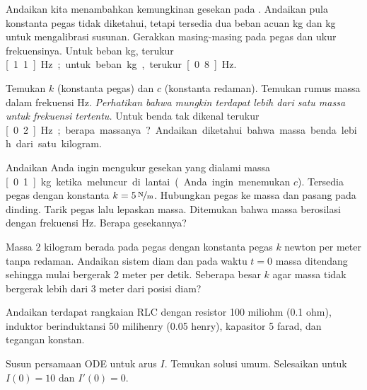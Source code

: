 \begin{exercise}
Andaikan kita menambahkan kemungkinan gesekan pada . Andaikan pula konstanta pegas tidak diketahui, tetapi tersedia dua beban acuan \unit[1]{kg} dan \unit[2]{kg} untuk mengalibrasi susunan. Gerakkan masing-masing pada pegas dan ukur frekuensinya. Untuk beban \unit[1]{kg}, terukur \unit[1.1]{Hz}; untuk beban \unit[2]{kg}, terukur \unit[0.8]{Hz}.
\begin{tasks}
\task Temukan $k$ (konstanta pegas) dan $c$ (konstanta redaman).
\task Temukan rumus massa dalam frekuensi Hz. \emph{Perhatikan bahwa mungkin terdapat lebih dari satu massa untuk frekuensi tertentu.}
\task Untuk benda tak dikenal terukur \unit[0.2]{Hz}; berapa massanya? Andaikan diketahui bahwa massa benda lebih dari satu kilogram.
\end{tasks}
\end{exercise}

\begin{exercise}
Andaikan Anda ingin mengukur gesekan yang dialami massa \unit[0.1]{kg} ketika meluncur di lantai (Anda ingin menemukan $c$). Tersedia pegas dengan konstanta $k=\unitfrac[5]{N}{m}$. Hubungkan pegas ke massa dan pasang pada dinding. Tarik pegas lalu lepaskan massa. Ditemukan bahwa massa berosilasi dengan frekuensi \unit[1]{Hz}. Berapa gesekannya?
\end{exercise}

\setcounter{exercise}{100}

\begin{exercise}
Massa $2$ kilogram berada pada pegas dengan konstanta pegas $k$ newton per meter tanpa redaman. Andaikan sistem diam dan pada waktu $t=0$ massa ditendang sehingga mulai bergerak 2 meter per detik. Seberapa besar $k$ agar massa tidak bergerak lebih dari 3 meter dari posisi diam?
\end{exercise}

\begin{exercise}
Andaikan terdapat rangkaian RLC dengan resistor 100 miliohm (0.1 ohm), induktor berinduktansi 50 milihenry (0.05 henry), kapasitor 5 farad, dan tegangan konstan.
\begin{tasks}
\task Susun persamaan ODE untuk arus $I$.
\task Temukan solusi umum.
\task Selesaikan untuk $I(0) = 10$ dan $I'(0) = 0$.
\end{tasks}
\end{exercise}

